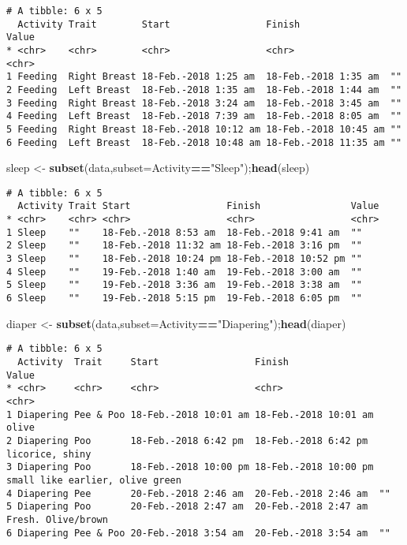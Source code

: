 \documentclass[10,portrait]{article}
\newenvironment{Shaded}{\begin{snugshade}}{\end{snugshade}}
\newcommand{\KeywordTok}[1]{\textcolor[rgb]{0.13,0.29,0.53}{\textbf{#1}}}
\newcommand{\DataTypeTok}[1]{\textcolor[rgb]{0.13,0.29,0.53}{#1}}
\newcommand{\StringTok}[1]{\textcolor[rgb]{0.31,0.60,0.02}{#1}}
\newcommand{\OperatorTok}[1]{\textcolor[rgb]{0.81,0.36,0.00}{\textbf{#1}}}
\newcommand{\NormalTok}[1]{#1}
\begin{document}
\begin{verbatim}
# A tibble: 6 x 5
  Activity Trait        Start                 Finish                Value
* <chr>    <chr>        <chr>                 <chr>                 <chr>
1 Feeding  Right Breast 18-Feb.-2018 1:25 am  18-Feb.-2018 1:35 am  ""   
2 Feeding  Left Breast  18-Feb.-2018 1:35 am  18-Feb.-2018 1:44 am  ""   
3 Feeding  Right Breast 18-Feb.-2018 3:24 am  18-Feb.-2018 3:45 am  ""   
4 Feeding  Left Breast  18-Feb.-2018 7:39 am  18-Feb.-2018 8:05 am  ""   
5 Feeding  Right Breast 18-Feb.-2018 10:12 am 18-Feb.-2018 10:45 am ""   
6 Feeding  Left Breast  18-Feb.-2018 10:48 am 18-Feb.-2018 11:35 am ""   
\end{verbatim}

\begin{Shaded}
\begin{Highlighting}[]
\NormalTok{sleep <-}\StringTok{ }\KeywordTok{subset}\NormalTok{(data,}\DataTypeTok{subset=}\NormalTok{Activity}\OperatorTok{==}\StringTok{"Sleep"}\NormalTok{);}\KeywordTok{head}\NormalTok{(sleep)}
\end{Highlighting}
\end{Shaded}

\begin{verbatim}
# A tibble: 6 x 5
  Activity Trait Start                 Finish                Value
* <chr>    <chr> <chr>                 <chr>                 <chr>
1 Sleep    ""    18-Feb.-2018 8:53 am  18-Feb.-2018 9:41 am  ""   
2 Sleep    ""    18-Feb.-2018 11:32 am 18-Feb.-2018 3:16 pm  ""   
3 Sleep    ""    18-Feb.-2018 10:24 pm 18-Feb.-2018 10:52 pm ""   
4 Sleep    ""    19-Feb.-2018 1:40 am  19-Feb.-2018 3:00 am  ""   
5 Sleep    ""    19-Feb.-2018 3:36 am  19-Feb.-2018 3:38 am  ""   
6 Sleep    ""    19-Feb.-2018 5:15 pm  19-Feb.-2018 6:05 pm  ""   
\end{verbatim}

\begin{Shaded}
\begin{Highlighting}[]
\NormalTok{diaper <-}\StringTok{ }\KeywordTok{subset}\NormalTok{(data,}\DataTypeTok{subset=}\NormalTok{Activity}\OperatorTok{==}\StringTok{"Diapering"}\NormalTok{);}\KeywordTok{head}\NormalTok{(diaper)}
\end{Highlighting}
\end{Shaded}

\begin{verbatim}
# A tibble: 6 x 5
  Activity  Trait     Start                 Finish                Value                          
* <chr>     <chr>     <chr>                 <chr>                 <chr>                          
1 Diapering Pee & Poo 18-Feb.-2018 10:01 am 18-Feb.-2018 10:01 am olive                          
2 Diapering Poo       18-Feb.-2018 6:42 pm  18-Feb.-2018 6:42 pm  licorice, shiny                
3 Diapering Poo       18-Feb.-2018 10:00 pm 18-Feb.-2018 10:00 pm small like earlier, olive green
4 Diapering Pee       20-Feb.-2018 2:46 am  20-Feb.-2018 2:46 am  ""                             
5 Diapering Poo       20-Feb.-2018 2:47 am  20-Feb.-2018 2:47 am  Fresh. Olive/brown             
6 Diapering Pee & Poo 20-Feb.-2018 3:54 am  20-Feb.-2018 3:54 am  ""                             
\end{verbatim}
\end{document}
